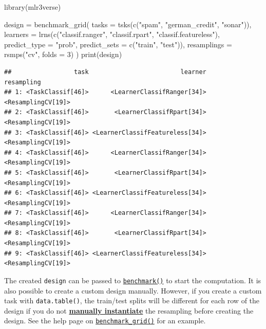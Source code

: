 \documentclass[
]{scrbook}
\newenvironment{Shaded}{\begin{snugshade}}{\end{snugshade}}
\newcommand{\AttributeTok}[1]{\textcolor[rgb]{0.77,0.63,0.00}{#1}}
\newcommand{\DecValTok}[1]{\textcolor[rgb]{0.00,0.00,0.81}{#1}}
\newcommand{\FunctionTok}[1]{\textcolor[rgb]{0.00,0.00,0.00}{#1}}
\newcommand{\NormalTok}[1]{#1}
\newcommand{\OtherTok}[1]{\textcolor[rgb]{0.56,0.35,0.01}{#1}}
\newcommand{\StringTok}[1]{\textcolor[rgb]{0.31,0.60,0.02}{#1}}
\renewenvironment{Shaded} {\begin{snugshade}\small} {\end{snugshade}}
\begin{document}
\begin{Shaded}
\begin{Highlighting}[]
\FunctionTok{library}\NormalTok{(mlr3verse)}

\NormalTok{design }\OtherTok{=} \FunctionTok{benchmark\_grid}\NormalTok{(}
  \AttributeTok{tasks =} \FunctionTok{tsks}\NormalTok{(}\FunctionTok{c}\NormalTok{(}\StringTok{"spam"}\NormalTok{, }\StringTok{"german\_credit"}\NormalTok{, }\StringTok{"sonar"}\NormalTok{)),}
  \AttributeTok{learners =} \FunctionTok{lrns}\NormalTok{(}\FunctionTok{c}\NormalTok{(}\StringTok{"classif.ranger"}\NormalTok{, }\StringTok{"classif.rpart"}\NormalTok{, }\StringTok{"classif.featureless"}\NormalTok{),}
    \AttributeTok{predict\_type =} \StringTok{"prob"}\NormalTok{, }\AttributeTok{predict\_sets =} \FunctionTok{c}\NormalTok{(}\StringTok{"train"}\NormalTok{, }\StringTok{"test"}\NormalTok{)),}
  \AttributeTok{resamplings =} \FunctionTok{rsmps}\NormalTok{(}\StringTok{"cv"}\NormalTok{, }\AttributeTok{folds =} \DecValTok{3}\NormalTok{)}
\NormalTok{)}
\FunctionTok{print}\NormalTok{(design)}
\end{Highlighting}
\end{Shaded}

\begin{verbatim}
##                 task                         learner         resampling
## 1: <TaskClassif[46]>      <LearnerClassifRanger[34]> <ResamplingCV[19]>
## 2: <TaskClassif[46]>       <LearnerClassifRpart[34]> <ResamplingCV[19]>
## 3: <TaskClassif[46]> <LearnerClassifFeatureless[34]> <ResamplingCV[19]>
## 4: <TaskClassif[46]>      <LearnerClassifRanger[34]> <ResamplingCV[19]>
## 5: <TaskClassif[46]>       <LearnerClassifRpart[34]> <ResamplingCV[19]>
## 6: <TaskClassif[46]> <LearnerClassifFeatureless[34]> <ResamplingCV[19]>
## 7: <TaskClassif[46]>      <LearnerClassifRanger[34]> <ResamplingCV[19]>
## 8: <TaskClassif[46]>       <LearnerClassifRpart[34]> <ResamplingCV[19]>
## 9: <TaskClassif[46]> <LearnerClassifFeatureless[34]> <ResamplingCV[19]>
\end{verbatim}

The created \texttt{design} can be passed to \href{https://mlr3.mlr-org.com/reference/benchmark.html}{\texttt{benchmark()}} to start the computation.
It is also possible to create a custom design manually.
However, if you create a custom task with \texttt{data.table()}, the train/test splits will be different for each row of the design if you do not \protect\hyperlink{resampling-inst}{\textbf{manually instantiate}} the resampling before creating the design.
See the help page on \href{https://mlr3.mlr-org.com/reference/benchmark_grid.html}{\texttt{benchmark\_grid()}} for an example.
\end{document}
